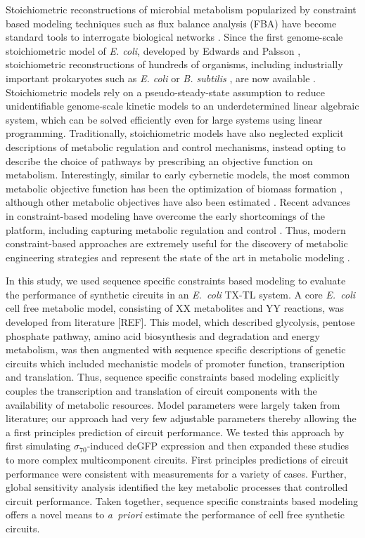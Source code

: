 \documentclass[12pt]{article}
\begin{document}
Stoichiometric reconstructions of microbial metabolism popularized by constraint based modeling techniques such as flux balance analysis (FBA) have become standard tools to interrogate biological networks \citep{2012_lewis_palsson_NatRevMicrobio}.
Since the first genome-scale stoichiometric model of \textit{E. coli}, developed by Edwards and Palsson \citep{2000_edwards_palsson_PNAS}, stoichiometric reconstructions of hundreds of organisms, including industrially important prokaryotes such as \textit{E. coli} \citep{Feist:2007aa} or \textit{B. subtilis} \citep{Oh:2007aa}, are now available \citep{2009_feist_palsson_NatRevMicrobio}.
Stoichiometric models rely on a pseudo-steady-state assumption to reduce unidentifiable genome-scale kinetic models to an underdetermined linear algebraic system, which can be solved efficiently even for large systems using linear programming.
Traditionally, stoichiometric models have also neglected explicit descriptions of metabolic regulation and control mechanisms, instead opting to describe the choice of pathways by prescribing an objective function on metabolism.
Interestingly, similar to early cybernetic models, the most common metabolic objective function has been the optimization of biomass formation \citep{2002_ibarra_edwards_palsson_Nat}, although other metabolic objectives have also been estimated \citep{2007_schuetz_sauer_MolSysBio}.
Recent advances in constraint-based modeling have overcome the early shortcomings of the platform, including capturing metabolic regulation and control \citep{2013_hyduke_lewis_palsson_MolBioSys}. Thus, modern constraint-based approaches are extremely useful for the discovery of metabolic engineering strategies and represent the state of the art in metabolic modeling \citep{2013_mccloskey_palsson_feist_MolSysBio, 2012_zomorrodi_maranas_MetaEng}.

In this study, we used sequence specific constraints based modeling to evaluate the performance of synthetic circuits in an \emph{E.~coli} TX-TL system.
A core \emph{E.~coli} cell free metabolic model, consisting of XX metabolites and YY reactions, was developed from literature [REF].
This model, which described glycolysis, pentose phosphate pathway, amino acid biosynthesis and degradation and energy metabolism, was then augmented with
sequence specific descriptions of genetic circuits which included mechanistic models of promoter function, transcription and translation.
Thus, sequence specific constraints based modeling explicitly couples
the transcription and translation of circuit components with the availability of metabolic resources.
Model parameters were largely taken from literature; our approach had very few adjustable parameters thereby allowing the a first principles prediction of circuit performance.
We tested this approach by first simulating $\sigma_{70}$-induced deGFP expression and then expanded these studies to more complex multicomponent circuits.
First principles predictions of circuit performance were consistent with measurements for a variety of cases.
Further, global sensitivity analysis identified the key metabolic processes that controlled circuit performance.
Taken together, sequence specific constraints based modeling offers a novel means to \emph{a~priori} estimate the performance of cell free synthetic circuits.
\end{document}
